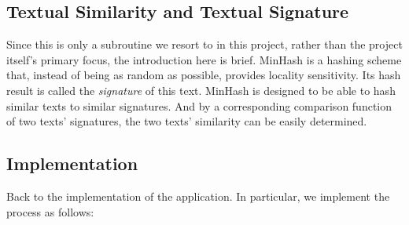 \documentclass{article}
\begin{document}
\subsection{Textual Similarity and Textual Signature}
Since this is only a subroutine we resort to in this project, rather than the project itself's primary focus, the introduction here is brief. MinHash is a hashing scheme that, instead of being as random as possible, provides locality sensitivity. Its hash result is called the \textit{signature} of this text. MinHash is designed to be able to hash similar texts to similar signatures. And by a corresponding comparison function of two texts' signatures, the two texts' similarity can be easily determined.

\subsection{Implementation}
Back to the implementation of the application. In particular, we implement the process as follows:
\end{document}
